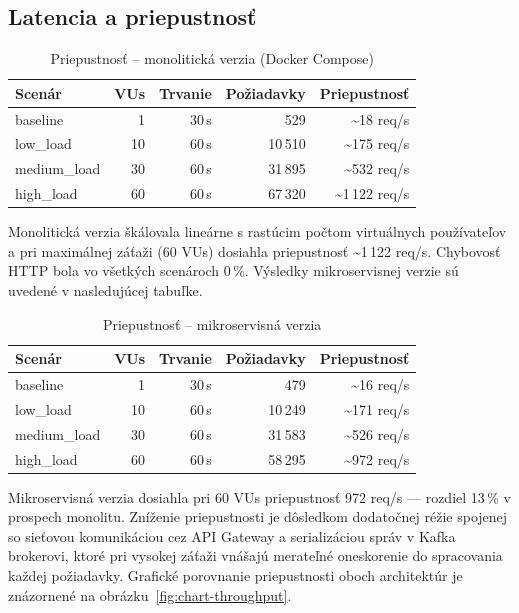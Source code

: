 \subsection{Latencia a priepustnosť}

\begin{table}[H]
\centering
\begin{tabular}{|l|r|r|r|r|}
\hline
Scenár & VUs & Trvanie & Požiadavky & Priepustnosť \\ \hline
baseline     & 1  & 30\,s  & 529     & \textasciitilde18 req/s   \\ \hline
low\_load    & 10 & 60\,s  & 10\,510 & \textasciitilde175 req/s  \\ \hline
medium\_load & 30 & 60\,s  & 31\,895 & \textasciitilde532 req/s  \\ \hline
high\_load   & 60 & 60\,s  & 67\,320 & \textasciitilde1\,122 req/s \\ \hline
\end{tabular}
\caption{Priepustnosť -- monolitická verzia (Docker Compose)}
\label{tab:eval-throughput-monolith}
\end{table}

Monolitická verzia škálovala lineárne s rastúcim počtom virtuálnych používateľov a pri maximálnej záťaži (60 VUs) dosiahla priepustnosť \textasciitilde1\,122 req/s. Chybovosť HTTP bola vo všetkých scenároch 0\,\%. Výsledky mikroservisnej verzie sú uvedené v nasledujúcej tabuľke.

\begin{table}[H]
\centering
\begin{tabular}{|l|r|r|r|r|}
\hline
Scenár & VUs & Trvanie & Požiadavky & Priepustnosť \\ \hline
baseline     & 1  & 30\,s  & 479     & \textasciitilde16 req/s  \\ \hline
low\_load    & 10 & 60\,s  & 10\,249 & \textasciitilde171 req/s \\ \hline
medium\_load & 30 & 60\,s  & 31\,583 & \textasciitilde526 req/s \\ \hline
high\_load   & 60 & 60\,s  & 58\,295 & \textasciitilde972 req/s \\ \hline
\end{tabular}
\caption{Priepustnosť -- mikroservisná verzia}
\label{tab:eval-throughput-micro}
\end{table}

Mikroservisná verzia dosiahla pri 60 VUs priepustnosť 972 req/s — rozdiel 13\,\% v prospech monolitu. Zníženie priepustnosti je dôsledkom dodatočnej réžie spojenej so sieťovou komunikáciou cez API Gateway a serializáciou správ v Kafka brokerovi, ktoré pri vysokej záťaži vnášajú merateľné oneskorenie do spracovania každej požiadavky. Grafické porovnanie priepustnosti oboch architektúr je znázornené na obrázku~\ref{fig:chart-throughput}.

